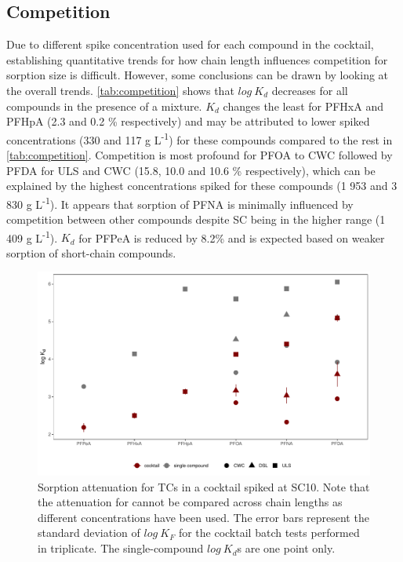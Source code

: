 \subsection{Competition}
Due to different spike concentration used for each compound in the cocktail, establishing quantitative trends for how chain length influences competition for sorption size is difficult. However, some conclusions can be drawn by looking at the overall trends. \cref{tab:competition} shows that $log~K_d$ decreases for all compounds in the presence of a mixture. $K_d$ changes the least for PFHxA and PFHpA (2.3 and 0.2 \% respectively) and may be attributed to lower spiked concentrations (330 and 117 \textmu g L\textsuperscript{-1}) for these compounds compared to the rest in \cref{tab:competition}. Competition is most profound for PFOA to CWC followed by PFDA for ULS and CWC (15.8, 10.0 and 10.6 \% respectively), which can be explained by the highest concentrations spiked for these compounds (1 953 and 3 830 \textmu g L\textsuperscript{-1}). It appears that sorption of PFNA is minimally influenced by competition between other compounds despite SC being in the higher range (1 409 \textmu g L\textsuperscript{-1}). $K_d$ for PFPeA is reduced by 8.2\% and is expected based on weaker sorption of short-chain compounds.

\begin{figure}
    \centering
    \includegraphics[width=\textwidth]{R/figs/C10_mixVsSingle_BC_plot.pdf}
    \caption{Sorption attenuation for TCs in a cocktail spiked at SC10. Note that the attenuation for cannot be compared across chain lengths as different concentrations have been used. The error bars represent the standard deviation of $log~K_F$ for the cocktail batch tests performed in triplicate. The single-compound $log~K_d$s are one point only.}
    \label{fig:competition}
\end{figure}

